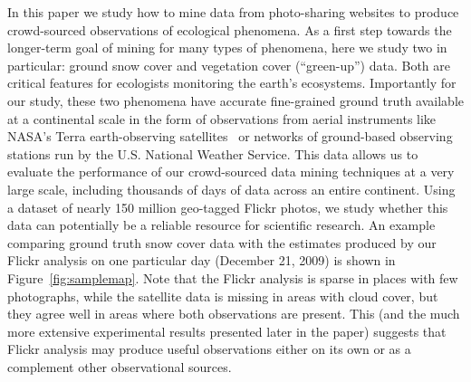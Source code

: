   In this paper we study how to mine data from
photo-sharing websites to produce crowd-sourced observations of
ecological phenomena.  As a first step towards the longer-term goal of
mining for many types of phenomena, here we study two in particular:
ground snow cover and vegetation cover (``green-up'') data. Both are
critical features for ecologists monitoring the earth's ecosystems.
Importantly for our study, these two phenomena have accurate
fine-grained ground truth available at a continental scale in the form
of observations from aerial instruments like NASA's Terra earth-observing
satellites~\cite{modisveg,modissnow} or networks of ground-based
observing stations run by the U.S. National Weather Service. This
data allows us to evaluate the performance of our crowd-sourced data mining
techniques at a very large scale, including thousands of days of data
across an entire continent.
 Using a dataset of nearly 150 million geo-tagged Flickr photos, we
 study whether this data can potentially be a
 reliable resource for scientific research.  An example comparing
 ground truth snow cover data with the estimates produced by our
 Flickr analysis on one particular day (December 21, 2009) is shown in
 Figure~\ref{fig:samplemap}. Note that the Flickr analysis is sparse
 in places with few photographs, while the satellite data is missing
 in areas with cloud cover, but they agree well in areas where both
 observations are present. This (and the much more extensive experimental results presented later in the paper) suggests that Flickr analysis may produce
 useful observations either on its own or as a complement other
 observational sources.



